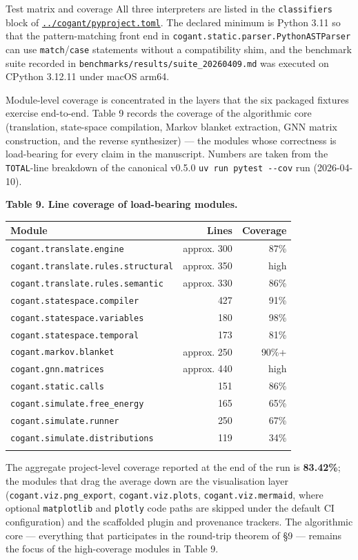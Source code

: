 \documentclass[
  ignorenonframetext,
]{beamer}
\newcounter{none} %
\begin{document}
\begin{frame}[fragile]{Test matrix and coverage}
All three interpreters are listed in the \texttt{classifiers} block of
\href{../cogant/pyproject.toml}{\texttt{../cogant/pyproject.toml}}. The
declared minimum is Python 3.11 so that the pattern-matching front end
in \texttt{cogant.static.parser.PythonASTParser} can use
\texttt{match}/\texttt{case} statements without a compatibility shim,
and the benchmark suite recorded in
\texttt{benchmarks/results/suite\_20260409.md} was executed on CPython
3.12.11 under macOS arm64.

Module-level coverage is concentrated in the layers that the six
packaged fixtures exercise end-to-end. Table 9 records the coverage of
the algorithmic core (translation, state-space compilation, Markov
blanket extraction, GNN matrix construction, and the reverse
synthesizer) --- the modules whose correctness is load-bearing for every
claim in the manuscript. Numbers are taken from the \texttt{TOTAL}-line
breakdown of the canonical v0.5.0 \texttt{uv\ run\ pytest\ -\/-cov} run
(2026-04-10).

\textbf{Table 9. Line coverage of load-bearing modules.}

{\def\LTcaptype{none} %
\begin{longtable}[]{@{}lrr@{}}
\toprule\noalign{}
Module & Lines & Coverage \\
\midrule\noalign{}
\endhead
\texttt{cogant.translate.engine} & approx. 300 & 87\% \\
\texttt{cogant.translate.rules.structural} & approx. 350 & high \\
\texttt{cogant.translate.rules.semantic} & approx. 330 & 86\% \\
\texttt{cogant.statespace.compiler} & 427 & 91\% \\
\texttt{cogant.statespace.variables} & 180 & 98\% \\
\texttt{cogant.statespace.temporal} & 173 & 81\% \\
\texttt{cogant.markov.blanket} & approx. 250 & 90\%+ \\
\texttt{cogant.gnn.matrices} & approx. 440 & high \\
\texttt{cogant.static.calls} & 151 & 86\% \\
\texttt{cogant.simulate.free\_energy} & 165 & 65\% \\
\texttt{cogant.simulate.runner} & 250 & 67\% \\
\texttt{cogant.simulate.distributions} & 119 & 34\% \\
\bottomrule\noalign{}
\end{longtable}
}

The aggregate project-level coverage reported at the end of the run is
\textbf{83.42\%}; the modules that drag the average down are the
visualisation layer (\texttt{cogant.viz.png\_export},
\texttt{cogant.viz.plots}, \texttt{cogant.viz.mermaid}, where optional
\texttt{matplotlib} and \texttt{plotly} code paths are skipped under the
default CI configuration) and the scaffolded plugin and provenance
trackers. The algorithmic core --- everything that participates in the
round-trip theorem of §9 --- remains the focus of the high-coverage
modules in Table 9.
\end{frame}
\end{document}
